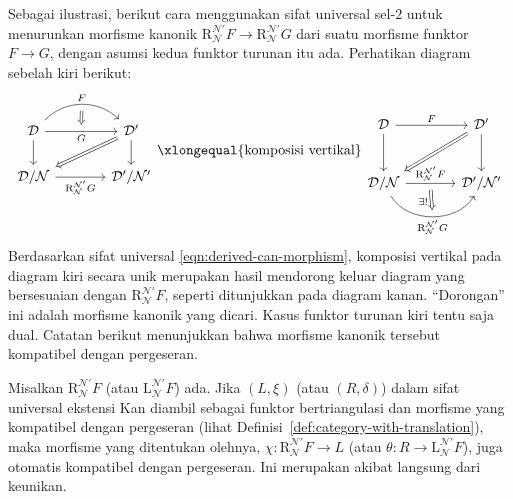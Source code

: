 Sebagai ilustrasi, berikut cara menggunakan sifat universal sel-$2$ untuk
menurunkan morfisme kanonik
$\mathrm{R}^{\mathcal{N}'}_{\mathcal{N}}F \to
\mathrm{R}^{\mathcal{N}'}_{\mathcal{N}}G$ dari suatu morfisme funktor
$F \to G$, dengan asumsi kedua funktor turunan itu ada. Perhatikan diagram
sebelah kiri berikut:
\[\begin{tikzcd}[column sep=large]
	\mathcal{D} \arrow[r, bend left=45, "F", ""' {name=U}] \arrow[r, "G"', "" {name=D}] \arrow[d] & \mathcal{D}' \arrow[d] \arrow[Rightarrow, ld] \\
	\mathcal{D}/\mathcal{N} \arrow[r, "{\mathrm{R}^{\mathcal{N}'}_{\mathcal{N}}G }"'] & \mathcal{D}'/\mathcal{N}' \arrow[Rightarrow, from=U, to=D]
\end{tikzcd} \xlongequal{\text{komposisi vertikal}} \begin{tikzcd}[column sep=large, row sep=large]
	\mathcal{D} \arrow[r, "F"] \arrow[d] & \mathcal{D}' \arrow[d] \arrow[Rightarrow, ld] \\
	\mathcal{D}/\mathcal{N} \arrow[r, "{\mathrm{R}^{\mathcal{N}'}_{\mathcal{N}}F }", ""' {name=U}] \arrow[bend right=60, r, "{\mathrm{R}^{\mathcal{N}'}_{\mathcal{N}}G }"', "" {name=D}] & \mathcal{D}'/\mathcal{N}' \arrow[Rightarrow, from=U, to=D, "{\exists!}"' near start]
\end{tikzcd}\]
Berdasarkan sifat universal \eqref{eqn:derived-can-morphism}, komposisi
vertikal pada diagram kiri secara unik merupakan hasil mendorong keluar diagram
yang bersesuaian dengan $\mathrm{R}^{\mathcal{N}'}_{\mathcal{N}}F$, seperti
ditunjukkan pada diagram kanan. ``Dorongan'' ini adalah morfisme kanonik yang
dicari. Kasus funktor turunan kiri tentu saja dual. Catatan berikut menunjukkan
bahwa morfisme kanonik tersebut kompatibel dengan pergeseran.

\begin{catatan}\label{rem:derived-can-morphism}
	Misalkan $\mathrm{R}^{\mathcal{N}'}_{\mathcal{N}}F$ (atau
	$\mathrm{L}^{\mathcal{N}'}_{\mathcal{N}}F$) ada. Jika $(L,\xi)$ (atau
	$(R,\delta)$) dalam sifat universal ekstensi Kan diambil sebagai funktor
	bertriangulasi dan morfisme yang kompatibel dengan pergeseran (lihat
	Definisi~\ref{def:category-with-translation}), maka morfisme yang ditentukan
olehnya,
	$\chi: \mathrm{R}^{\mathcal{N}'}_{\mathcal{N}}F \to L$ (atau
	$\theta: R \to \mathrm{L}^{\mathcal{N}'}_{\mathcal{N}}F$), juga otomatis
kompatibel dengan pergeseran. Ini merupakan akibat langsung dari keunikan.
\end{catatan}

